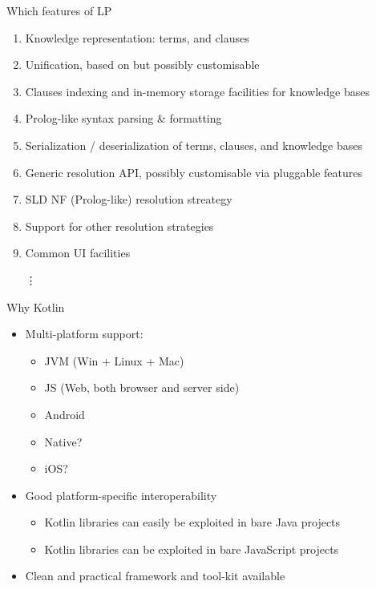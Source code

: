 \documentclass[handout]{beamer}
\begin{document}
\begin{frame}{Which features of LP}
    \begin{enumerate}
        \item Knowledge representation: \alert{terms}, and \alert{clauses}
        \vfill
        \item \alert{Unification}, based on \cite{MartelliMontanari1982} but possibly customisable
        \vfill
        \item Clauses \alert{indexing} and in-memory \alert{storage} facilities for \alert{knowledge bases}
        \vfill
        \item Prolog-like syntax \alert{parsing} \& \alert{formatting}
        \vfill
        \item \alert{Serialization} / \alert{deserialization} of terms, clauses, and knowledge bases
        \vfill
        \item Generic \alert{resolution} API, possibly customisable via \alert{pluggable features}
        \vfill
        \item \alert{SLD NF} (Prolog-like) resolution streategy \cite{Robinson65SLD,Clark77}
        \vfill
        \item Support for other resolution strategies
        \vfill
        \item Common \alert{UI} facilities
        \vfill
        \item[\vdots]
    \end{enumerate}
\end{frame}

\begin{frame}{Why Kotlin}
    \begin{itemize}
        \item Multi-platform support:
        \begin{itemize}
            \item JVM (Win + Linux + Mac)
            \item JS (Web, both browser and server side)
            \item Android
            \item Native?
            \item iOS?
        \end{itemize}

        \vfill

        \item Good platform-specific interoperability
        \begin{itemize}
            \item Kotlin libraries can easily be exploited in bare Java projects
            \item Kotlin libraries can be exploited in bare JavaScript projects
        \end{itemize}

        \vfill

        \item Clean and practical framework and tool-kit available
    \end{itemize}
\end{frame}
\end{document}
